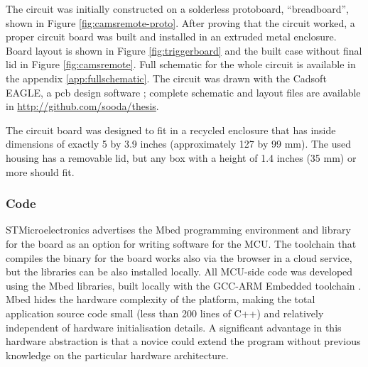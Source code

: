 The circuit was initially constructed on a solderless protoboard, ``breadboard'', shown in Figure \ref{fig:camsremote-proto}.
After proving that the circuit worked, a proper circuit board was built and installed in an extruded metal enclosure.
Board layout is shown in Figure \ref{fig:triggerboard} and the built case without final lid in Figure \ref{fig:camsremote}.
Full schematic for the whole circuit is available in the appendix \ref{app:fullschematic}.
The circuit was drawn with the Cadsoft EAGLE, a pcb design software \cite{eaglepcb}; complete schematic and layout files are available in \url {http://github.com/sooda/thesis}.

The circuit board was designed to fit in a recycled enclosure that has inside dimensions of exactly 5 by 3.9 inches (approximately 127 by 99 mm).
The used housing has a removable lid, but any box with a height of 1.4 inches (35 mm) or more should fit.





\subsubsection{Code}

STMicroelectronics advertises the Mbed programming environment and library for the board as an option for writing software for the MCU. \cite{mbednucleo}
The toolchain that compiles the binary for the board works also via the browser in a cloud service, but the libraries can be also installed locally.
All MCU-side code was developed using the Mbed libraries, built locally with the GCC-ARM Embedded toolchain \cite{launchpad-gcc-arm}.
Mbed hides the hardware complexity of the platform, making the total application source code small (less than 200 lines of C++) and relatively independent of hardware initialisation details.
A significant advantage in this hardware abstraction is that a novice could extend the program without previous knowledge on the particular hardware architecture.


